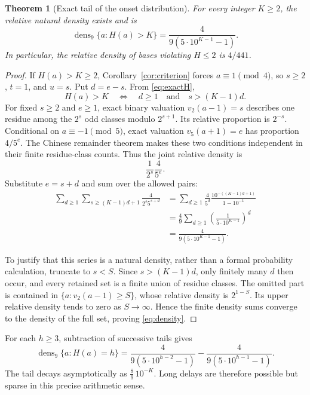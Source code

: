 \documentclass[11pt,letterpaper]{article}
\numberwithin{equation}{section}
\newtheorem{theorem}{Theorem}[section]
\theoremstyle{definition}
\theoremstyle{remark}
\begin{document}
\begin{theorem}[Exact tail of the onset distribution]\label{thm:density}
For every integer $K\ge2$, the relative natural density exists and is
\begin{equation}\label{eq:density}
 \boxed{\ \operatorname{dens}_9\{a:H(a)>K\}
 =\frac{4}{9(5\cdot10^{K-1}-1)}.\ }
\end{equation}
In particular, the relative density of bases violating $H\le2$ is $4/441$.
\end{theorem}
\begin{proof}
If $H(a)>K\ge2$, Corollary~\ref{cor:criterion} forces $a\equiv1\pmod4$, so $s\ge2$, $t=1$, and $u=s$. Put $d=e-s$. From \eqref{eq:exactH},
\[
 H(a)>K
 \quad\Longleftrightarrow\quad
 d\ge1\quad\text{and}\quad s>(K-1)d.
\]
For fixed $s\ge2$ and $e\ge1$, exact binary valuation $v_2(a-1)=s$ describes one residue among the $2^s$ odd classes modulo $2^{s+1}$. Its relative proportion is $2^{-s}$. Conditional on $a\equiv-1\pmod5$, exact valuation $v_5(a+1)=e$ has proportion $4/5^e$. The Chinese remainder theorem makes these two conditions independent in their finite residue-class counts. Thus the joint relative density is
\[
 \frac{1}{2^s}\frac{4}{5^e}.
\]
Substitute $e=s+d$ and sum over the allowed pairs:
\begin{align*}
 \sum_{d\ge1}\sum_{s\ge(K-1)d+1}
     \frac{4}{2^s5^{s+d}}
 &=\sum_{d\ge1}\frac{4}{5^d}
     \frac{10^{-((K-1)d+1)}}{1-10^{-1}}\\
 &=\frac49\sum_{d\ge1}
     \left(\frac{1}{5\cdot10^{K-1}}\right)^d\\
 &=\frac{4}{9(5\cdot10^{K-1}-1)}.
\end{align*}

To justify that this series is a natural density, rather than a formal probability calculation, truncate to $s<S$. Since $s>(K-1)d$, only finitely many $d$ then occur, and every retained set is a finite union of residue classes. The omitted part is contained in $\{a:v_2(a-1)\ge S\}$, whose relative density is $2^{1-S}$. Its upper relative density tends to zero as $S\to\infty$. Hence the finite density sums converge to the density of the full set, proving \eqref{eq:density}.
\end{proof}

For each $h\ge3$, subtraction of successive tails gives
\begin{equation}\label{eq:pointmass}
 \operatorname{dens}_9\{a:H(a)=h\}
 =\frac{4}{9(5\cdot10^{h-2}-1)}
  -\frac{4}{9(5\cdot10^{h-1}-1)}.
\end{equation}
The tail decays asymptotically as $\frac8{9}\,10^{-K}$. Long delays are therefore possible but sparse in this precise arithmetic sense.
\end{document}
